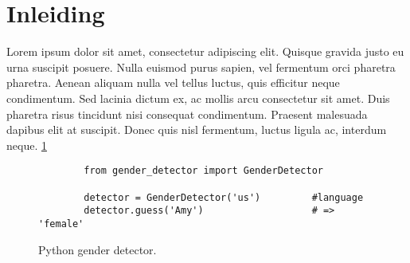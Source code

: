 \section{Inleiding}
Lorem ipsum dolor sit amet, consectetur adipiscing elit. Quisque gravida justo eu urna suscipit posuere. Nulla euismod purus sapien, vel fermentum orci pharetra pharetra. Aenean aliquam nulla vel tellus luctus, quis efficitur neque condimentum. Sed lacinia dictum ex, ac mollis arcu consectetur sit amet. Duis pharetra risus tincidunt nisi consequat condimentum. Praesent malesuada dapibus elit at suscipit. Donec quis nisl fermentum, luctus ligula ac, interdum neque. \figurename{ \ref{genderdetect}} \citep{norman2014incremental} %

\begin{figure}[H] %

    \begin{verbatim} 
        from gender_detector import GenderDetector
        
        detector = GenderDetector('us')         #language
        detector.guess('Amy')                   # => 'female'
        \end{verbatim}
        
    \caption{Python gender detector.}\label{genderdetect}
    
\end{figure} 